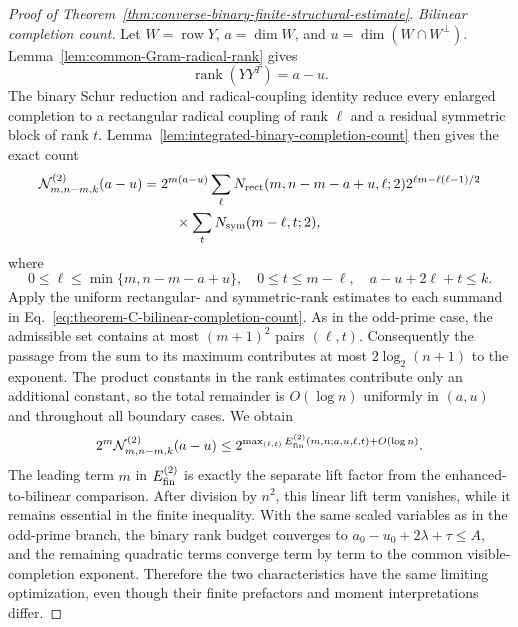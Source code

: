 \documentclass[11pt]{article}
\newcommand{\rank}{\operatorname{rank}}
\newcommand{\1}{\mathbf 1}
\theoremstyle{plain}
\theoremstyle{definition}
\theoremstyle{remark}
\begin{document}
\begin{proof}[Proof of Theorem~\ref{thm:converse-binary-finite-structural-estimate}]
\smallskip
\noindent\emph{Bilinear completion count.}
Let $W=\operatorname{row}Y$, $a=\dim W$, and
$u=\dim(W\cap W^\perp)$.  Lemma~\ref{lem:common-Gram-radical-rank} gives
\begin{equation}
 \rank(YY^T)=a-u.
 \label{eq:theorem-C-shadow-rank}
\end{equation}
The binary Schur reduction and radical-coupling identity reduce every enlarged
completion to a rectangular radical coupling of rank $\ell$ and a residual
symmetric block of rank $t$.  Lemma~\ref{lem:integrated-binary-completion-count}
then gives the exact count
\begin{align}
 \mathcal N_{m,n-m,k}^{(2)}(a-u)
 ={}&2^{m(a-u)}
 \sum_{\ell}N_{\rm rect}(m,n-m-a+u,\ell;2)
 2^{\ell m-\ell(\ell-1)/2}\notag\\
 &\quad\times\sum_t N_{\rm sym}(m-\ell,t;2),
 \label{eq:theorem-C-bilinear-completion-count}
\end{align}
where
\begin{equation}
 0\le\ell\le\min\{m,n-m-a+u\},\quad
 0\le t\le m-\ell,\quad
 a-u+2\ell+t\le k.
 \label{eq:theorem-C-completion-ranges}
\end{equation}
Apply the uniform rectangular- and symmetric-rank estimates to each summand in
Eq.~\eqref{eq:theorem-C-bilinear-completion-count}.  As in the odd-prime
case, the admissible set contains at most $(m+1)^2$ pairs $(\ell,t)$.
Consequently the passage from the sum to its maximum contributes at most
$2\log_2(n+1)$ to the exponent.  The product constants in the rank estimates
contribute only an additional constant, so the total remainder is
$O(\log n)$ uniformly in $(a,u)$ and throughout all boundary cases.  We obtain
\begin{equation}
 2^m\mathcal N_{m,n-m,k}^{(2)}(a-u)
 \le
 2^{\max_{(\ell,t)}E_{\rm fin}^{(2)}(m,n;a,u,\ell,t)+O(\log n)}.
 \label{eq:theorem-C-completion-exponent-bound}
\end{equation}
The leading term $m$ in $E_{\rm fin}^{(2)}$ is exactly the separate lift factor
from the enhanced-to-bilinear comparison.
After division by $n^2$, this linear lift term vanishes, while it remains
essential in the finite inequality.  With the same scaled variables as in the
odd-prime branch, the binary rank budget converges to
$a_0-u_0+2\lambda+\tau\le A$, and the remaining quadratic
terms converge term by term to the common visible-completion exponent.
Therefore the two characteristics have the same limiting optimization, even
though their finite prefactors and moment interpretations differ.


\end{proof}
\end{document}
